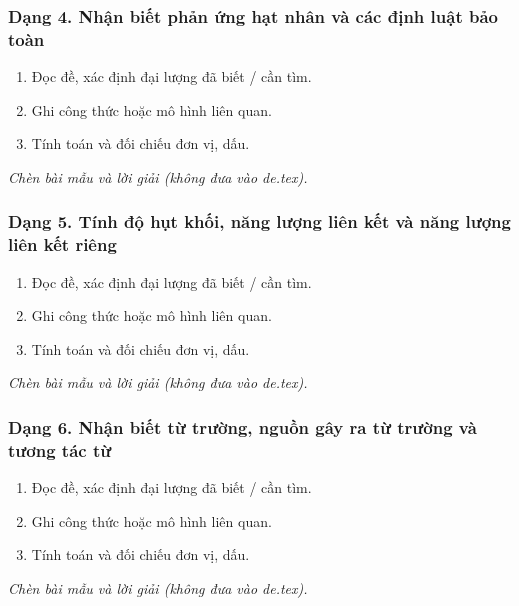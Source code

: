 \subsubsection{Dạng 4. Nhận biết phản ứng hạt nhân và các định luật bảo toàn}
\begin{phuongphap}
\begin{enumerate}
\item Đọc đề, xác định đại lượng đã biết / cần tìm.
\item Ghi công thức hoặc mô hình liên quan.
\item Tính toán và đối chiếu đơn vị, dấu.
\end{enumerate}
\end{phuongphap}
\begin{vidumau}
\textit{Chèn bài mẫu và lời giải (không đưa vào de.tex).}
\end{vidumau}

\subsubsection{Dạng 5. Tính độ hụt khối, năng lượng liên kết và năng lượng liên kết riêng}
\begin{phuongphap}
\begin{enumerate}
\item Đọc đề, xác định đại lượng đã biết / cần tìm.
\item Ghi công thức hoặc mô hình liên quan.
\item Tính toán và đối chiếu đơn vị, dấu.
\end{enumerate}
\end{phuongphap}
\begin{vidumau}
\textit{Chèn bài mẫu và lời giải (không đưa vào de.tex).}
\end{vidumau}

\subsubsection{Dạng 6. Nhận biết từ trường, nguồn gây ra từ trường và tương tác từ}
\begin{phuongphap}
\begin{enumerate}
\item Đọc đề, xác định đại lượng đã biết / cần tìm.
\item Ghi công thức hoặc mô hình liên quan.
\item Tính toán và đối chiếu đơn vị, dấu.
\end{enumerate}
\end{phuongphap}
\begin{vidumau}
\textit{Chèn bài mẫu và lời giải (không đưa vào de.tex).}
\end{vidumau}

